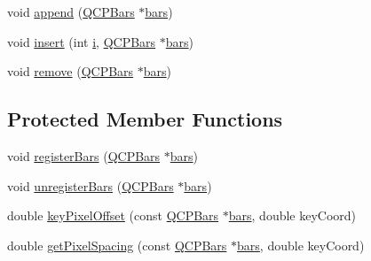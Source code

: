 \begin{DoxyCompactItemize}
void \hyperlink{class_q_c_p_bars_group_a809ed63cc4ff7cd5b0b8c96b470163d3}{append} (\hyperlink{class_q_c_p_bars}{Q\+C\+P\+Bars} $\ast$\hyperlink{class_q_c_p_bars_group_a7c72ed1f8cd962c93b8c42ab96cd91ec}{bars})
\item 
void \hyperlink{class_q_c_p_bars_group_a309a5f7233db189f3ea9c2d04ece6c13}{insert} (int \hyperlink{_v_s_a___u_t_2_comparision_pictures_2_createtest_image_8m_a6f6ccfcf58b31cb6412107d9d5281426}{i}, \hyperlink{class_q_c_p_bars}{Q\+C\+P\+Bars} $\ast$\hyperlink{class_q_c_p_bars_group_a7c72ed1f8cd962c93b8c42ab96cd91ec}{bars})
\item 
void \hyperlink{class_q_c_p_bars_group_a215e28a5944f1159013a0e19169220e7}{remove} (\hyperlink{class_q_c_p_bars}{Q\+C\+P\+Bars} $\ast$\hyperlink{class_q_c_p_bars_group_a7c72ed1f8cd962c93b8c42ab96cd91ec}{bars})
\end{DoxyCompactItemize}
\subsection*{Protected Member Functions}
\begin{DoxyCompactItemize}
\item 
void \hyperlink{class_q_c_p_bars_group_a7b00514f19ad58d0bb3fd5246a67fae2}{register\+Bars} (\hyperlink{class_q_c_p_bars}{Q\+C\+P\+Bars} $\ast$\hyperlink{class_q_c_p_bars_group_a7c72ed1f8cd962c93b8c42ab96cd91ec}{bars})
\item 
void \hyperlink{class_q_c_p_bars_group_ac7073cdd7b1a40c6cb4b5f908145f8c4}{unregister\+Bars} (\hyperlink{class_q_c_p_bars}{Q\+C\+P\+Bars} $\ast$\hyperlink{class_q_c_p_bars_group_a7c72ed1f8cd962c93b8c42ab96cd91ec}{bars})
\item 
double \hyperlink{class_q_c_p_bars_group_a8e2ca6002e7bab49670144d048a2bcc9}{key\+Pixel\+Offset} (const \hyperlink{class_q_c_p_bars}{Q\+C\+P\+Bars} $\ast$\hyperlink{class_q_c_p_bars_group_a7c72ed1f8cd962c93b8c42ab96cd91ec}{bars}, double key\+Coord)
\item 
double \hyperlink{class_q_c_p_bars_group_a0beccd41bc3841a4c5b284823bc7d2de}{get\+Pixel\+Spacing} (const \hyperlink{class_q_c_p_bars}{Q\+C\+P\+Bars} $\ast$\hyperlink{class_q_c_p_bars_group_a7c72ed1f8cd962c93b8c42ab96cd91ec}{bars}, double key\+Coord)
\end{DoxyCompactItemize}

